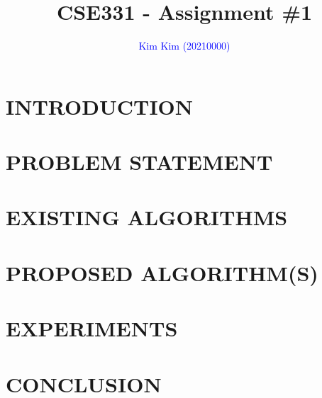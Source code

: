 \documentclass[sigconf]{acmart}
\begin{document}
\title{CSE331 - Assignment \#1}

\author{\textcolor{blue}{Kim Kim (20210000)}}

\renewcommand{\shortauthors}{\textcolor{blue}{Kim et al.}}



\renewcommand\footnotetextcopyrightpermission[1]{} %



\maketitle


\section{INTRODUCTION}
\lipsum[1-2]

\section{PROBLEM STATEMENT}
\lipsum[1]

\section{EXISTING ALGORITHMS}
\lipsum[1-2]

\section{PROPOSED ALGORITHM(S)}
\lipsum[1-2]

\section{EXPERIMENTS}
\lipsum[1]

\section{CONCLUSION}
\lipsum[1]




\end{document}
